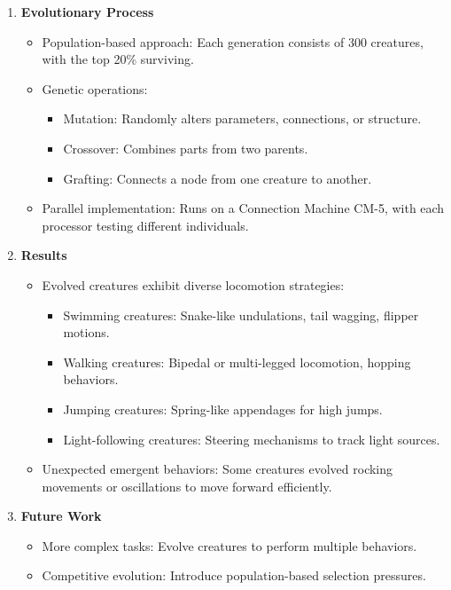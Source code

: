 \documentclass[12pt]{article}
\begin{document}
\begin{enumerate}[noitemsep]
\begin{itemize}[noitemsep]
    \end{itemize}
    \item \textbf{Evolutionary Process}
    \begin{itemize}[noitemsep]
        \item Population-based approach: Each generation consists of 300 creatures, with the top 20\% surviving.
        \item Genetic operations:
        \begin{itemize}[noitemsep]
            \item Mutation: Randomly alters parameters, connections, or structure.
            \item Crossover: Combines parts from two parents.
            \item Grafting: Connects a node from one creature to another.
        \end{itemize}
        \item Parallel implementation: Runs on a Connection Machine CM-5, with each processor testing different individuals.
    \end{itemize}
    \item \textbf{Results}
    \begin{itemize}[noitemsep]
        \item Evolved creatures exhibit diverse locomotion strategies:
        \begin{itemize}[noitemsep]
            \item Swimming creatures: Snake-like undulations, tail wagging, flipper motions.
            \item Walking creatures: Bipedal or multi-legged locomotion, hopping behaviors.
            \item Jumping creatures: Spring-like appendages for high jumps.
            \item Light-following creatures: Steering mechanisms to track light sources.
        \end{itemize}
        \item Unexpected emergent behaviors: Some creatures evolved rocking movements or oscillations to move forward efficiently.
    \end{itemize}
    \item \textbf{Future Work}
    \begin{itemize}[noitemsep]
        \item More complex tasks: Evolve creatures to perform multiple behaviors.
        \item Competitive evolution: Introduce population-based selection pressures.

\end{itemize}
\end{enumerate}
\end{document}
